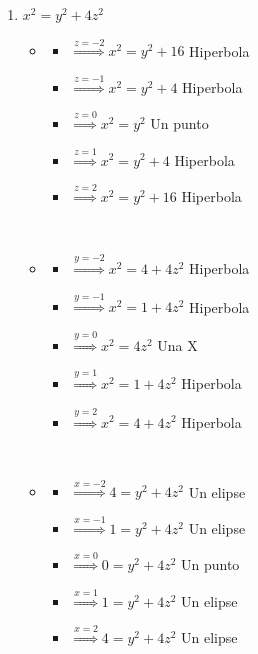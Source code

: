 \documentclass[../practica_02.tex]{subfiles}
\begin{document}
\begin{enumerate}
\begin{enumerate}
                \item $x^2 = y^2 + 4z^2$

                    \begin{itemize}
                        \item
                            \begin{itemize}
                                \item $\stackrel{z=-2}{\Rightarrow}  x^2 = y^2 + 16 $ Hiperbola
                                \item $\stackrel{z=-1}{\Rightarrow}  x^2 = y^2 + 4  $ Hiperbola
                                \item $\stackrel{z=0}{\Rightarrow}   x^2 = y^2      $ Un punto
                                \item $\stackrel{z=1}{\Rightarrow}   x^2 = y^2 + 4  $ Hiperbola
                                \item $\stackrel{z=2}{\Rightarrow}   x^2 = y^2 + 16 $ Hiperbola
                            \end{itemize}

                            $ $

                        \item
                            \begin{itemize}
                                \item $\stackrel{y=-2}{\Rightarrow} x^2 = 4 + 4z^2 $ Hiperbola
                                \item $\stackrel{y=-1}{\Rightarrow} x^2 = 1 + 4z^2 $ Hiperbola
                                \item $\stackrel{y=0}{\Rightarrow}  x^2 = 4z^2     $ Una X
                                \item $\stackrel{y=1}{\Rightarrow}  x^2 = 1 + 4z^2 $ Hiperbola
                                \item $\stackrel{y=2}{\Rightarrow}  x^2 = 4 + 4z^2 $ Hiperbola
                            \end{itemize}

                            $ $

                        \item
                            \begin{itemize}
                                \item $\stackrel{x=-2}{\Rightarrow} 4 = y^2 + 4z^2 $ Un elipse
                                \item $\stackrel{x=-1}{\Rightarrow} 1 = y^2 + 4z^2 $ Un elipse
                                \item $\stackrel{x=0}{\Rightarrow}  0 = y^2 + 4z^2 $ Un punto
                                \item $\stackrel{x=1}{\Rightarrow}  1 = y^2 + 4z^2 $ Un elipse
                                \item $\stackrel{x=2}{\Rightarrow}  4 = y^2 + 4z^2 $ Un elipse
                            \end{itemize}


\end{itemize}
\end{enumerate}
\end{enumerate}
\end{document}
